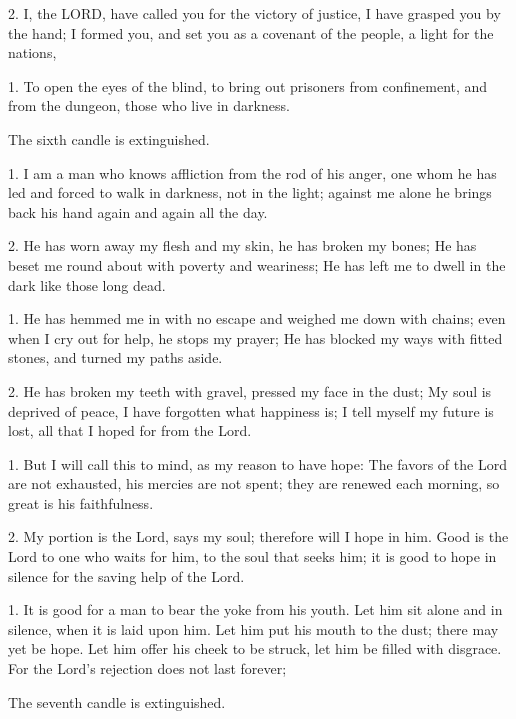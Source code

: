 2. I, the LORD, have called you for the victory of justice, I have grasped you
by the hand; I formed you, and set you as a covenant of the people, a light for
the nations,

1. To open the eyes of the blind, to bring out prisoners from confinement, and
from the dungeon, those who live in darkness.



\begin{rubric}
  The sixth candle is extinguished.
\end{rubric}


1. I am a man who knows affliction from the rod of his anger, one whom he has
led and forced to walk in darkness, not in the light; against me alone he
brings back his hand again and again all the day.

2. He has worn away my flesh and my skin, he has broken my bones; He has beset
me round about with poverty and weariness; He has left me to dwell in the dark
like those long dead.

1. He has hemmed me in with no escape and weighed me down with chains; even
when I cry out for help, he stops my prayer; He has blocked my ways with fitted
stones, and turned my paths aside.

2. He has broken my teeth with gravel, pressed my face in the dust; My soul is
deprived of peace, I have forgotten what happiness is; I tell myself my future
is lost, all that I hoped for from the Lord.

1. But I will call this to mind, as my reason to have hope: The favors of the
Lord are not exhausted, his mercies are not spent; they are renewed each
morning, so great is his faithfulness.

2. My portion is the Lord, says my soul; therefore will I hope in him. Good is
the Lord to one who waits for him, to the soul that seeks him; it is good to
hope in silence for the saving help of the Lord.

1. It is good for a man to bear the yoke from his youth. Let him sit alone and
in silence, when it is laid upon him. Let him put his mouth to the dust; there
may yet be hope. Let him offer his cheek to be struck, let him be filled with
disgrace. For the Lord's rejection does not last forever;



\begin{rubric}
  The seventh candle is extinguished.
\end{rubric}

